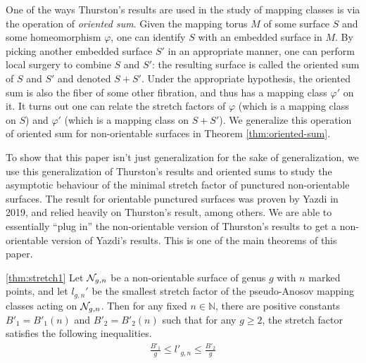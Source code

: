 One of the ways Thurston's results are used in the study of mapping classes is via the operation of
\emph{oriented sum}. Given the mapping torus $M$ of some surface $S$ and some homeomorphism $\varphi$, one can
identify $S$ with an embedded surface in $M$. By picking another embedded surface $S'$ in an appropriate
manner, one can perform local surgery to combine $S$ and $S'$: the resulting surface is called the oriented
sum of $S$ and $S'$ and denoted $S+S'$. Under the appropriate hypothesis, the oriented sum is also the fiber
of some other fibration, and thus has a mapping class $\varphi'$ on it. It turns out one can relate the
stretch factors of $\varphi$ (which is a mapping class on $S$) and $\varphi'$ (which is a mapping class on
$S + S'$). We generalize this operation of oriented sum for non-orientable surfaces in Theorem
\ref{thm:oriented-sum}.

To show that this paper isn't just generalization for the sake of generalization, we use this generalization
of Thurston's results and oriented sums to study the asymptotic behaviour of the minimal stretch factor of
punctured non-orientable surfaces. The result for orientable punctured surfaces was proven by Yazdi in 2019,
and relied heavily on Thurston's result, among others. We are able to essentially ``plug in'' the
non-orientable version of Thurston's results to get a non-orientable version of Yazdi's results. This is one
of the main theorems of this paper.
\begin{manualtheorem}{\ref{thm:stretch1}}
  Let $\mathcal{N}_{g,n}$ be a non-orientable surface of genus $g$ with $n$ marked points, and let $l_{g,n}'$ be
  the smallest stretch factor of the pseudo-Anosov mapping classes acting on $\mathcal{N}_{g,n}$.
  Then for any fixed $n \in \mathbb{N}$, there are positive constants $B'_1 = B'_1(n)$ and $B'_2 = B'_2(n)$ such
  that for any $g \geq 2$, the stretch factor satisfies the following inequalities.
  \begin{align*}
    \frac{B'_1}{g} \leq l'_{g,n} \leq \frac{B'_2}{g}
  \end{align*}
\end{manualtheorem}
